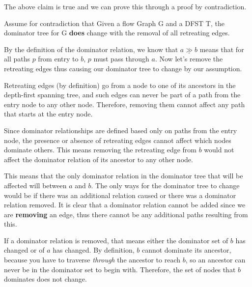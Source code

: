 \documentclass[12pt]{article}
\newcommand{\dom}{\underline{\gg}}
\begin{document}
\begin{enumerate}
  \begin{mdframed}

           \vspace{.5em}

    The above claim is true and we can prove this through a proof by contradiction.
    
           \vspace{.5em}

    Assume for contradiction that Given a flow Graph G and a DFST T, the dominator tree for G \textbf{does} change with the removal of all retreating edges.

    \vspace{0.5em}
    
    By the definition of the dominator relation, we know that $a \dom b$ means that for all paths $p$ from entry to $b$, $p$ must pass through $a$. Now let's remove the retreating edges thus causing our dominator tree to change by our assumption.
     \vspace{0.5em}

    Retreating edges (by definition) go from a node to one of its ancestors in the depth-first spanning tree, and such edges can never be part of a path from the entry node to any other node. Therefore, removing them cannot affect any path that starts at the entry node.
    
   \vspace{.5em}
   
    Since dominator relationships are defined based only on paths from the entry node, the presence or absence of retreating edges cannot affect which nodes dominate others. This means removing the retreating edge from $b$ would not affect the dominator relation of its ancestor to any other node. 

          \vspace{.5em}

    This means that the only dominator relation in the dominator tree that will be affected will between $a$ and $b$. The only ways for the dominator tree to change would be if there was an additional relation caused or there was a dominator relation removed. It is clear that a dominator relation cannot be added since we are \textbf{removing} an edge, thus there cannot be any additional paths resulting from this.

     \vspace{.5em}

    If a dominator relation is removed, that means either the dominator set of $b$ has changed or of $a$ has changed. By definition, $b$ cannot dominate its ancestor, because you have to traverse \textit{through} the ancestor to reach $b$, so an ancestor can never be in the dominator set to begin with. Therefore, the set of nodes that $b$ dominates does not change.
    

\end{mdframed}
\end{enumerate}
\end{document}
